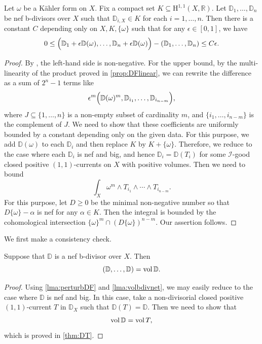 \begin{lemma}\label{lma:perturbDF}
    Let $\omega$ be a Kähler form on $X$. Fix a compact set $K\subseteq \mathrm{H}^{1,1}(X,\mathbb{R})$.
    Let $\mathbb{D}_1,\ldots,\mathbb{D}_n$ be nef b-divisors over $X$ such that $\mathbb{D}_{i,X}\in K$ for each $i=1,\ldots,n$. Then there is a constant $C$ depending only on $X,K,\{\omega\}$ such that for any $\epsilon\in [0,1]$, we have
    \[
    0\leq \Bigl( \mathbb{D}_1+\epsilon \mathbb{D}(\omega),\ldots,\mathbb{D}_n+\epsilon \mathbb{D}(\omega) \Bigr)-\left( \mathbb{D}_1,\ldots,\mathbb{D}_n \right)\leq C\epsilon.
    \]
\end{lemma}
\begin{proof}
    By , the left-hand side is non-negative. For the upper bound, by the multi-linearity of the product proved in \cref{prop:DFlinear}, we can rewrite the difference as a sum of $2^n-1$ terms like
    \[
        \epsilon^{m} \Bigl( \mathbb{D}(\omega)^{m}, \mathbb{D}_{i_1},\ldots, \mathbb{D}_{i_{n-m}} \Bigr),
    \]
    where $J\subseteq\{1,\ldots,n\}$ is a non-empty subset of cardinality $m$, and $\{i_1,\ldots,i_{n-m}\}$ is the complement of $J$. We need to show that these coefficients are uniformly bounded by a constant depending only on the given data. For this purpose, we add $\mathbb{D}(\omega)$ to each $\mathbb{D}_i$ and then replace $K$ by $K+\{\omega\}$. Therefore, we reduce to the case where each $\mathbb{D}_i$ is nef and big, and hence $\mathbb{D}_i=\mathbb{D}(T_i)$ for some $\mathcal{I}$-good closed positive $(1,1)$-currents on $X$ with positive volumes. Then we need to bound
    \[
        \int_X \omega^m\wedge T_{i_1}\wedge \cdots \wedge T_{i_{n-m}}.
    \]
    For this purpose, let $D\geq 0$ be the minimal non-negative number so that $D\{\omega\}-\alpha$ is nef for any $\alpha\in K$. Then the integral is bounded by the cohomological intersection $\{\omega\}^m\cap (D\{\omega\})^{n-m}$. Our assertion follows.
\end{proof}




We first make a consistency check.
\begin{proposition}\label{prop:bdiv:L678}
    Suppose that $\mathbb{D}$ is a nef b-divisor over $X$. Then
    \[
    \left( \mathbb{D},\ldots,\mathbb{D} \right)=\operatorname{vol} \mathbb{D}.
    \]
\end{proposition}
\begin{proof}
    Using \cref{lma:perturbDF} and \cref{lma:volbdivnet}, we may easily reduce to the case where $\mathbb{D}$ is nef and big. In this case, take a non-divisorial closed positive $(1,1)$-current $T$ in $\mathbb{D}_X$ such that $\mathbb{D}(T)=\mathbb{D}$. Then we need to show that
    \[
    \operatorname{vol} \mathbb{D}=\operatorname{vol} T,
    \]
    which is proved in \cref{thm:DT}.
\end{proof}

